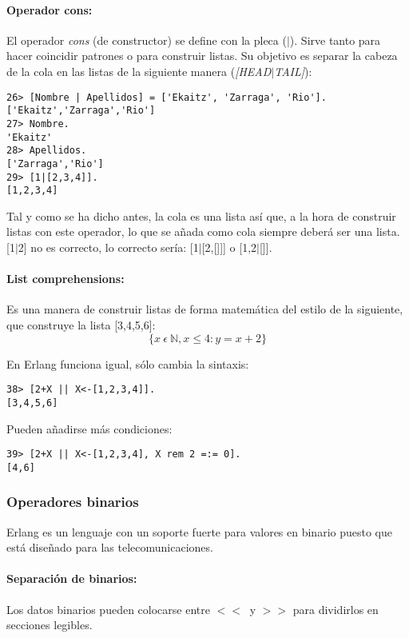 \paragraph{Operador cons:}
El operador \textit{cons} (de constructor) se define con la pleca ($|$). Sirve tanto para hacer
coincidir patrones o para construir listas. Su objetivo es separar la cabeza de la cola en las listas de la
siguiente manera (\textit{[HEAD$|$TAIL]}):

\begin{lstlisting}
26> [Nombre | Apellidos] = ['Ekaitz', 'Zarraga', 'Rio'].
['Ekaitz','Zarraga','Rio']
27> Nombre.
'Ekaitz'
28> Apellidos.
['Zarraga','Rio']
29> [1|[2,3,4]].
[1,2,3,4]
\end{lstlisting}

Tal y como se ha dicho antes, la cola es una lista así que, a la hora de construir listas con este operador,
lo que se añada como cola siempre deberá ser una lista. [1$|$2] no es correcto, lo correcto sería:
[1$|$[2,[]]] o [1,2$|$[]].

\paragraph{List comprehensions:}
Es una manera de construir listas de forma matemática del estilo de la siguiente, que construye la lista
[3,4,5,6]:
\begin{equation}
\{x\: \epsilon\: \mathbb{N}, x \leq  4: y = x+2\}
\end{equation}

En Erlang funciona igual, sólo cambia la sintaxis:
\begin{lstlisting}
38> [2+X || X<-[1,2,3,4]].
[3,4,5,6]
\end{lstlisting}

Pueden añadirse más condiciones:
\begin{lstlisting}
39> [2+X || X<-[1,2,3,4], X rem 2 =:= 0].
[4,6]
\end{lstlisting}

\subsubsection{Operadores binarios}

Erlang es un lenguaje con un soporte fuerte para valores en binario puesto que está diseñado para las
telecomunicaciones.

\paragraph{Separación de binarios:} Los datos binarios pueden colocarse entre $<<\:$  y $>>$ para dividirlos
en secciones legibles.


